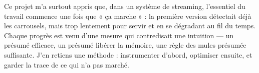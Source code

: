 Ce projet m'a surtout appris que, dans un système de streaming, l'essentiel du
travail commence une fois que « ça marche » : la première version détectait
déjà les carrousels, mais trop lentement pour servir et en se dégradant au
fil du temps. Chaque progrès est venu d'une mesure qui contredisait une
intuition --- un  présumé efficace, un 
présumé libérer la mémoire, une règle des mules présumée suffisante. J'en
retiens une méthode : instrumenter d'abord, optimiser ensuite, et garder la
trace de ce qui n'a pas marché.
